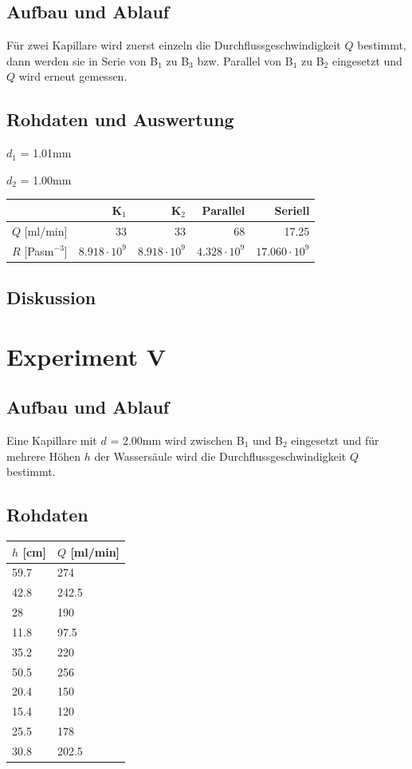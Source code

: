 \documentclass[12pt,a4paper]{article}
\newcommand{\subscript}[1]{$_{#1}$}
\newcommand{\B}[1]{B\subscript{#1}}
\begin{document}
\subsection*{Aufbau und Ablauf}
F\"ur zwei Kapillare wird zuerst einzeln die Durchflussgeschwindigkeit $Q$ bestimmt, dann werden sie in Serie von \B{1} zu \B{3} bzw. Parallel von \B{1} zu \B{2} eingesetzt und $Q$ wird erneut gemessen.

\subsection*{Rohdaten und Auswertung}

$d_1$ = 1.01mm

$d_2$ = 1.00mm

\vspace{5pt}
\begin{tabular}{|l|r|r|r|r|}
\hline
&K\subscript{1}&K\subscript{2}&Parallel&Seriell\\
\hline
$Q$ [ml/min]&33&33&68&17.25\\
$R$ [Pasm$^{-3}$]&$8.918\cdot 10^9$&$8.918\cdot 10^9$&$4.328\cdot 10^9$&$17.060\cdot 10^9$\\
\hline
\end{tabular}


\subsection*{Diskussion}


\section*{Experiment V}

\subsection*{Aufbau und Ablauf}
Eine Kapillare mit $d$ = 2.00mm wird zwischen \B{1} und \B{2} eingesetzt und f\"ur mehrere H\"ohen $h$ der Wassers\"aule wird die Durchflussgeschwindigkeit $Q$ bestimmt.

\subsection*{Rohdaten}
\begin{tabular}{|l|l|}
\hline
$h$ [cm]&$Q$ [ml/min]\\
\hline
59.7&274\\
42.8&242.5\\
28&190\\
11.8&97.5\\
35.2&220\\
50.5&256\\
20.4&150\\
15.4&120\\
25.5&178\\
30.8&202.5\\
\hline
\end{tabular}
\end{document}
